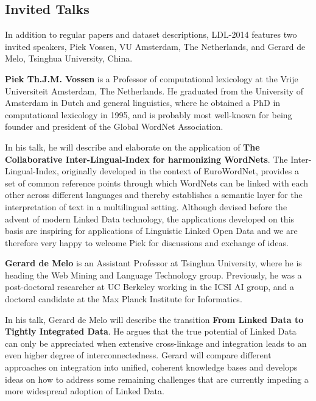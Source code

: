 \subsection{Invited Talks}

In addition to regular papers and dataset descriptions, LDL-2014 features two invited speakers, Piek Vossen, VU Amsterdam, The Netherlands, and Gerard de Melo, Tsinghua University, China.

\smallskip

\textbf{Piek Th.J.M. Vossen} is a Professor of computational lexicology at the Vrije Universiteit Amsterdam, The Netherlands. He graduated from the University of Amsterdam in Dutch and general linguistics, where he obtained a PhD in computational lexicology in 1995, and is probably most well-known for being founder and president of the Global WordNet Association.

In his talk, he will describe and elaborate on the application of \textbf{The Collaborative Inter-Lingual-Index for harmonizing WordNets}. 
The Inter-Lingual-Index, originally developed in the context of EuroWordNet, provides a set of common reference points through which WordNets can be linked with each other across different languages and thereby establishes a semantic layer for the interpretation of text in a multilingual setting. Although devised before the advent of modern Linked Data technology, the applications developed on this basis are inspiring for applications of Linguistic Linked Open Data and we are therefore very happy to welcome Piek for discussions and exchange of ideas.


\smallskip

\textbf{Gerard de Melo} is an Assistant Professor at Tsinghua
 University, where he is heading the Web Mining and Language Technology
 group. Previously, he was a post-doctoral researcher at UC Berkeley
 working in the ICSI AI group, and a doctoral candidate at the Max Planck
 Institute for Informatics.

In his talk, Gerard de Melo will describe the transition \textbf{From Linked Data to Tightly Integrated Data}. 
He argues that the true potential of Linked Data can only be appreciated when extensive cross-linkage and integration leads to an even higher degree of interconnectedness. Gerard will compare different approaches on integration into unified, coherent knowledge bases and develops ideas on how to address some remaining challenges that are currently
 impeding a more widespread adoption of Linked Data. 
